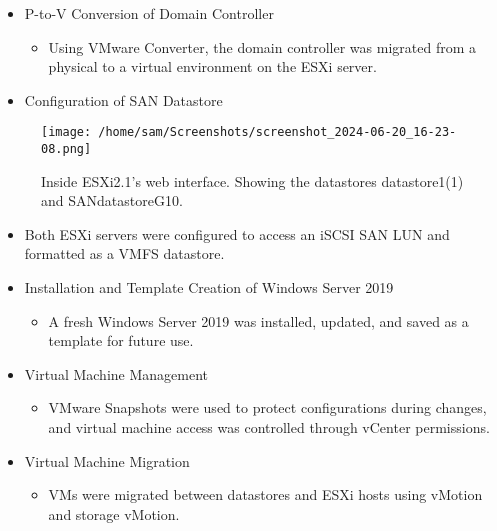 \documentclass[letterpaper,12pt]{article}
\begin{document}
\begin{itemize}
\item P-to-V Conversion of Domain Controller
\begin{itemize}
\item Using VMware Converter, the domain controller was migrated from a physical to a virtual environment on the ESXi server.
\end{itemize}
\item Configuration of SAN Datastore
\end{itemize}
\begin{figure}[H]
\centering
\texttt{[image: /home/sam/Screenshots/screenshot\_2024-06-20\_16-23-08.png]}
\caption{Inside ESXi2.1's web interface. Showing the datastores datastore1(1) and SANdatastoreG10.}
\end{figure}
\begin{itemize}
\item Both ESXi servers were configured to access an iSCSI SAN LUN and formatted as a VMFS datastore.
\end{itemize}
\begin{itemize}
\item Installation and Template Creation of Windows Server 2019
\begin{itemize}
\item A fresh Windows Server 2019 was installed, updated, and saved as a template for future use.
\end{itemize}
\item Virtual Machine Management
\begin{itemize}
\item VMware Snapshots were used to protect configurations during changes, and virtual machine access was controlled through vCenter permissions.
\end{itemize}
\item Virtual Machine Migration
\begin{itemize}
\item VMs were migrated between datastores and ESXi hosts using vMotion and storage vMotion.
\end{itemize}
\end{itemize}
\end{document}
